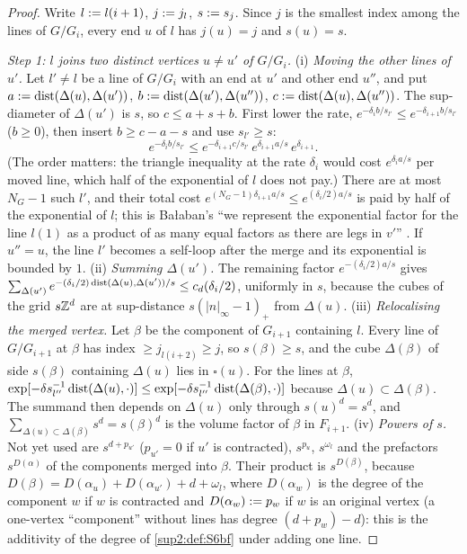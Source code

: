 \begin{proof}
Write $l:= l(i+1)$, $j:= j_l$, $s:= s_j$. Since $j$ is the smallest index among the lines of $G/G_i$, every end $u$ of $l$ has $j(u)=j$ and $s(u)=s$.

\emph{Step 1: $l$ joins two distinct vertices $u\ne u'$ of $G/G_i$.} (i) \emph{Moving the other lines of $u'$.} Let $l'\ne l$ be a line of $G/G_i$ with an end at $u'$ and other end $u''$, and put $a:=\operatorname{dist}(\Delta(u),\Delta(u'))$, $b:=\operatorname{dist}(\Delta(u'),\Delta(u''))$, $c:=\operatorname{dist}(\Delta(u),\Delta(u''))$. The sup-diameter of $\Delta(u')$ is $s$, so $c\le a+s+b$. First lower the rate, $e^{-\delta_ib/s_{l'}}\le e^{-\delta_{i+1}b/s_{l'}}$ ($b\ge0$), then insert $b\ge c-a-s$ and use $s_{l'}\ge s$:
\[
e^{-\delta_ib/s_{l'}}\le e^{-\delta_{i+1}c/s_{l'}}\,e^{\delta_{i+1}a/s}\,e^{\delta_{i+1}}.
\]
(The order matters: the triangle inequality at the rate $\delta_i$ would cost $e^{\delta_ia/s}$ per moved line, which half of the exponential of $l$ does not pay.) There are at most $N_G-1$ such $l'$, and their total cost $e^{(N_G-1)\delta_{i+1}a/s}\le e^{(\delta_i/2)a/s}$ is paid by half of the exponential of $l$; this is Ba{\l}aban's ``we represent the exponential factor for the line $l(1)$ as a product of as many equal factors as there are legs in $v'$'' \cite[p.~427]{Ba3}. If $u''=u$, the line $l'$ becomes a self-loop after the merge and its exponential is bounded by $1$. (ii) \emph{Summing $\Delta(u')$.} The remaining factor $e^{-(\delta_i/2)a/s}$ gives $\sum_{\Delta(u')}e^{-(\delta_i/2)\operatorname{dist}(\Delta(u),\Delta(u'))/s}\le c_d(\delta_i/2)$, uniformly in $s$, because the cubes of the grid $s\mathbb Z^d$ are at sup-distance $s(|n|_\infty-1)_+$ from $\Delta(u)$. (iii) \emph{Relocalising the merged vertex.} Let $\beta$ be the component of $G_{i+1}$ containing $l$. Every line of $G/G_{i+1}$ at $\beta$ has index $\ge j_{l(i+2)}\ge j$, so $s(\beta)\ge s$, and the cube $\Delta(\beta)$ of side $s(\beta)$ containing $\Delta(u)$ lies in $\square(u)$. For the lines at $\beta$, $\exp[-\delta s_{l''}^{-1}\operatorname{dist}(\Delta(u),\cdot)]\le\exp[-\delta s_{l''}^{-1}\operatorname{dist}(\Delta(\beta),\cdot)]$ because $\Delta(u)\subset\Delta(\beta)$. The summand then depends on $\Delta(u)$ only through $s(u)^d=s^d$, and $\sum_{\Delta(u)\subset\Delta(\beta)}s^d=s(\beta)^d$ is the volume factor of $\beta$ in $F_{i+1}$. (iv) \emph{Powers of $s$.} Not yet used are $s^{d+p_{u'}}$ ($p_{u'}=0$ if $u'$ is contracted), $s^{p_u}$, $s^{\omega_l}$ and the prefactors $s^{D(\alpha)}$ of the components merged into $\beta$. Their product is $s^{D(\beta)}$, because $D(\beta)=D(\alpha_u)+D(\alpha_{u'})+d+\omega_l$, where $D(\alpha_w)$ is the degree of the component $w$ if $w$ is contracted and $D(\alpha_w):= p_w$ if $w$ is an original vertex (a one-vertex ``component'' without lines has degree $(d+p_w)-d$): this is the additivity of the degree of \cref{sup2:def:S6bf} under adding one line.


\end{proof}
